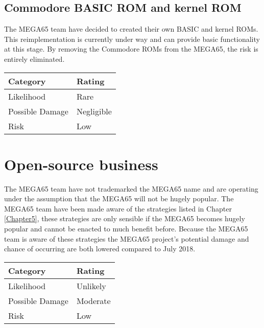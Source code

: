 \subsection{Commodore BASIC ROM and kernel ROM}
The MEGA65 team have decided to created their own BASIC and kernel ROMs. This reimplementation is currently under way and can provide basic functionality at this stage. By removing the Commodore ROMs from the MEGA65, the risk is entirely eliminated. \\

\begin{tabular}{l|l} %
    	\textbf{Category} 	&	\textbf{Rating} \\
      \hline
     Likelihood			&	Rare \\
     Possible Damage 	& 	Negligible \\
     Risk 				&	Low		\\	
    \end{tabular}


\section{Open-source business}
The MEGA65 team have not trademarked the MEGA65 name and are operating under the assumption that the MEGA65 will not be hugely popular. The MEGA65 team have been made aware of the strategies listed in Chapter \ref{Chapter5}, these strategies are only sensible if the MEGA65 becomes hugely popular and cannot be enacted to much benefit before. Because the MEGA65 team is aware of these strategies the MEGA65 project's potential damage and chance of occurring are both lowered compared to July 2018. \\

\begin{tabular}{l|l} %
    	\textbf{Category} 	&	\textbf{Rating} \\
      \hline
     Likelihood			&	Unlikely \\
     Possible Damage 	& 	Moderate \\
     Risk 				&	Low		\\	
    \end{tabular}


